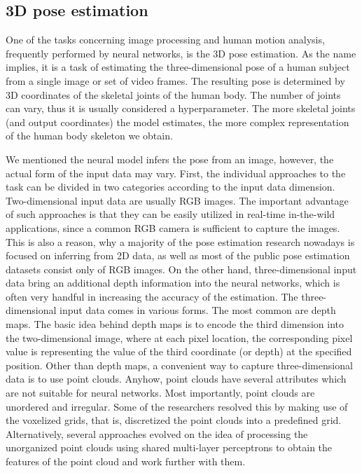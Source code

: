 \subsection{3D pose estimation}
One of the tasks concerning image processing and human motion analysis, frequently performed by neural networks, is the 3D pose estimation. As the name implies, it is a task of estimating the three-dimensional pose of a human subject from a single image or set of video frames. The resulting pose is determined by 3D coordinates of the skeletal joints of the human body. The number of joints can vary, thus it is usually considered a hyperparameter. The more skeletal joints (and output coordinates) the model estimates, the more complex representation of the human body skeleton we obtain.\par
\vspace{5mm}
\noindent
We mentioned the neural model infers the pose from an image, however, the actual form of the input data may vary. First, the individual approaches to the task can be divided in two categories according to the input data dimension. Two-dimensional input data are usually RGB images. The important advantage of such approaches is that they can be easily utilized in real-time in-the-wild applications, since a common RGB camera is sufficient to capture the images. This is also a reason, why a majority of the pose estimation research nowadays is focused on inferring from 2D data, as well as most of the public pose estimation datasets consist only of RGB images. On the other hand, three-dimensional input data bring an additional depth information into the neural networks, which is often very handful in increasing the accuracy of the estimation. The three-dimensional input data comes in various forms. The most common are depth maps. The basic idea behind depth maps is to encode the third dimension into the two-dimensional image, where at each pixel location, the corresponding pixel value is representing the value of the third coordinate (or depth) at the specified position. Other than depth maps, a convenient way to capture three-dimensional data is to use point clouds. Anyhow, point clouds have several attributes which are not suitable for neural networks. Most importantly, point clouds are unordered and irregular. Some of the researchers resolved this by making use of the voxelized grids, that is, discretized the point clouds into a predefined grid. Alternatively, several approaches evolved on the idea of processing the unorganized point clouds using shared multi-layer perceptrons to obtain the features of the point cloud and work further with them.\par


